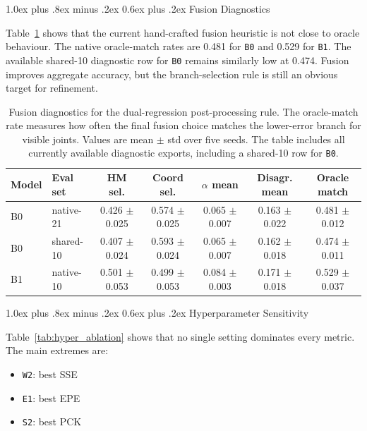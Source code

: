 \documentclass[10pt,letterpaper]{article}
\makeatletter
\renewcommand\subsection{\@startsection{subsection}{2}{\z@}%
  {1.0ex plus .8ex minus .2ex}%
  {0.6ex plus .2ex}%
  {\normalfont\itshape}}
\makeatother
\begin{document}
\subsection{Fusion Diagnostics}

Table~\ref{tab:fusion_diagnostics} shows that the current hand-crafted fusion heuristic is not close to oracle behaviour. The native oracle-match rates are 0.481 for \texttt{B0} and 0.529 for \texttt{B1}. The available shared-10 diagnostic row for \texttt{B0} remains similarly low at 0.474. Fusion improves aggregate accuracy, but the branch-selection rule is still an obvious target for refinement.

\begin{table}[H]
\centering
\footnotesize
\caption{Fusion diagnostics for the dual-regression post-processing rule. The oracle-match rate measures how often the final fusion choice matches the lower-error branch for visible joints. Values are mean $\pm$ std over five seeds. The table includes all currently available diagnostic exports, including a shared-10 row for \texttt{B0}.}
\label{tab:fusion_diagnostics}
\begin{tabular}{llccccc}
\toprule
Model & Eval set & HM sel. & Coord sel. & $\alpha$ mean & Disagr. mean & Oracle match \\
\midrule
B0 & native-21 & 0.426 $\pm$ 0.025 & 0.574 $\pm$ 0.025 & 0.065 $\pm$ 0.007 & 0.163 $\pm$ 0.022 & 0.481 $\pm$ 0.012 \\
B0 & shared-10 & 0.407 $\pm$ 0.024 & 0.593 $\pm$ 0.024 & 0.065 $\pm$ 0.007 & 0.162 $\pm$ 0.018 & 0.474 $\pm$ 0.011 \\
B1 & native-10 & 0.501 $\pm$ 0.053 & 0.499 $\pm$ 0.053 & 0.084 $\pm$ 0.003 & 0.171 $\pm$ 0.018 & 0.529 $\pm$ 0.037 \\
\bottomrule
\end{tabular}
\end{table}

\subsection{Hyperparameter Sensitivity}

Table~\ref{tab:hyper_ablation} shows that no single setting dominates every metric. The main extremes are:
\begin{itemize}
\item \texttt{W2}: best SSE
\item \texttt{E1}: best EPE
\item \texttt{S2}: best PCK
\end{itemize}
\end{document}
